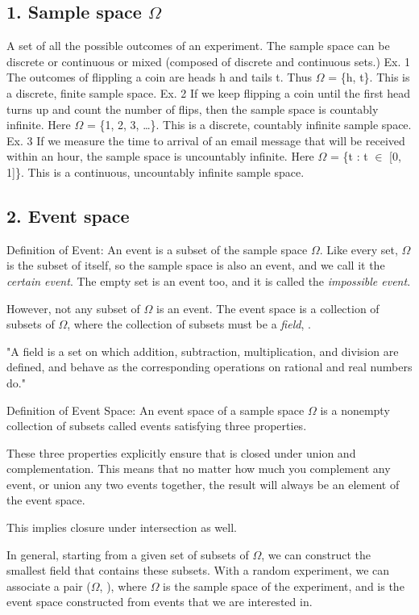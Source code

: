 \documentclass[11pt]{article}
\begin{document}
\subsection{1. Sample space \(\Omega\)}
\label{sec:org916a53c}
A set of all the possible outcomes of an experiment.
The sample space can be discrete or continuous or mixed (composed of discrete and continuous sets.)
Ex. 1
The outcomes of flippling a coin are heads h and tails t. Thus \(\Omega\) = \{h, t\}.
This is a discrete, finite sample space.
Ex. 2
If we keep flipping a coin until the first head turns up and count the number of flips, then the sample space is countably infinite. Here \(\Omega\) = \{1, 2, 3, \ldots{}\}.
This is a discrete, countably infinite sample space.
Ex. 3
If we measure the time to arrival of an email message that will be received within an hour, the sample space is uncountably infinite. Here \(\Omega\) = \{t : t \(\in\) [0, 1]\}.
This is a continuous, uncountably infinite sample space.
\subsection{2. Event space }
\label{sec:org2969bae}
Definition of Event:
An event is a subset of the sample space \(\Omega\).
Like every set, \(\Omega\) is the subset of itself, so the sample space is also an event, and we call it the \emph{certain event}.
The empty set is an event too, and it is called the \emph{impossible event}.

However, not any subset of \(\Omega\) is an event.
The event space is a collection of subsets of \(\Omega\), where the collection of subsets must be a \emph{field}, .

"A field is a set on which addition, subtraction, multiplication, and division are defined, and behave as the corresponding operations on rational and real numbers do."

Definition of Event Space:
An event space of a sample space \(\Omega\) is a nonempty collection of subsets called events satisfying three properties.

These three properties explicitly ensure that  is closed under union and complementation. This means that no matter how much you complement any event, or union any two events together, the result will always be an element of the event space.

This implies closure under intersection as well.

In general, starting from a given set of subsets of \(\Omega\), we can construct the smallest field  that contains these subsets. With a random experiment, we can associate a pair (\(\Omega\), ), where \(\Omega\) is the sample space of the experiment, and  is the event space constructed from events that we are interested in.
\end{document}
